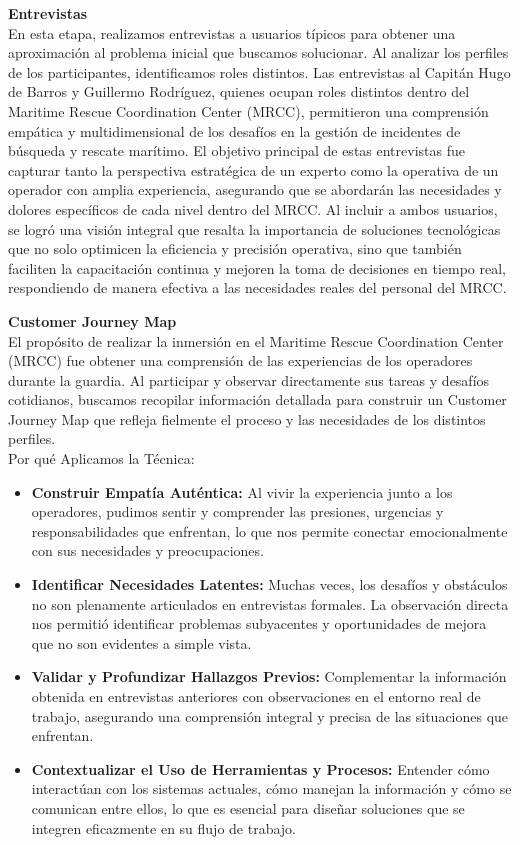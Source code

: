 \textbf{Entrevistas}\\
En esta etapa, realizamos entrevistas a usuarios típicos para obtener una aproximación al problema inicial que buscamos solucionar. Al analizar los perfiles de los participantes, identificamos roles 
distintos.
Las entrevistas al Capitán Hugo de Barros y Guillermo Rodríguez, quienes ocupan roles distintos dentro del Maritime Rescue Coordination Center (MRCC), permitieron una comprensión empática y 
multidimensional de los desafíos en la gestión de incidentes de búsqueda y rescate marítimo. 
El objetivo principal de estas entrevistas fue capturar tanto la perspectiva estratégica de un experto como la operativa de un operador con amplia experiencia, asegurando que se abordarán las 
necesidades y dolores específicos de cada nivel dentro del MRCC. 
Al incluir a ambos usuarios, se logró una visión integral que resalta la importancia de soluciones tecnológicas que no solo optimicen la eficiencia y precisión operativa, sino que también 
faciliten la capacitación continua y mejoren la toma de decisiones en tiempo real, respondiendo de manera efectiva a las necesidades reales del personal del MRCC.

\textbf{Customer Journey Map}\\
El propósito de realizar la inmersión en el Maritime Rescue Coordination Center (MRCC) fue obtener una comprensión de las experiencias de los operadores durante la guardia. Al participar y 
observar directamente sus tareas y desafíos cotidianos, buscamos recopilar información detallada para construir un Customer Journey Map que refleja fielmente el proceso y las necesidades de los 
distintos perfiles.\\
Por qué Aplicamos la Técnica:
\begin{itemize}
    \item \textbf{Construir Empatía Auténtica:} Al vivir la experiencia junto a los operadores, pudimos sentir y comprender las presiones, urgencias y responsabilidades que enfrentan, lo que nos permite 
    conectar emocionalmente con sus necesidades y preocupaciones.
    \item \textbf{Identificar Necesidades Latentes:} Muchas veces, los desafíos y obstáculos no son plenamente articulados en entrevistas formales. La observación directa nos permitió identificar 
    problemas subyacentes y oportunidades de mejora que no son evidentes a simple vista.
    \item \textbf{Validar y Profundizar Hallazgos Previos:} Complementar la información obtenida en entrevistas anteriores con observaciones en el entorno real de trabajo, asegurando una comprensión 
    integral y precisa de las situaciones que enfrentan.
    \item \textbf{Contextualizar el Uso de Herramientas y Procesos:} Entender cómo interactúan con los sistemas actuales, cómo manejan la información y cómo se comunican entre ellos, lo que es esencial 
    para diseñar soluciones que se integren eficazmente en su flujo de trabajo.
\end{itemize}

